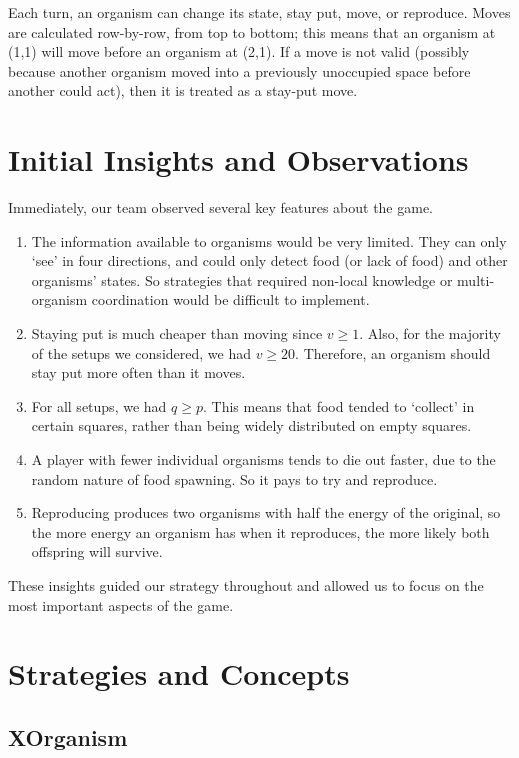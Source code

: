 \documentclass[
10pt, %
letterpaper, %
oneside, %
headinclude,footinclude, %
english
]{article}
\begin{document}
Each turn, an organism can change its state, stay put, move, or reproduce. Moves are calculated row-by-row, from top to bottom; this means that an organism at (1,1) will move before an organism at (2,1). If a move is not valid (possibly because another organism moved into a previously unoccupied space before another could act), then it is treated as a stay-put move.

\section{Initial Insights and Observations}

Immediately, our team observed several key features about the game.

\begin{enumerate}
  \item The information available to organisms would be very limited. They can only `see' in four directions, and could only detect food (or lack of food) and other organisms' states. So strategies that required non-local knowledge or multi-organism coordination would be difficult to implement.
  \item Staying put is much cheaper than moving since $v \geq 1$. Also, for the majority of the setups we considered, we had $v \geq 20$. Therefore, an organism should stay put more often than it moves.
  \item For all setups, we had $q \geq p$. This means that food tended to `collect' in certain squares, rather than being widely distributed on empty squares.
  \item A player with fewer individual organisms tends to die out faster, due to the random nature of food spawning. So it pays to try and reproduce.
  \item Reproducing produces two organisms with half the energy of the original, so the more energy an organism has when it reproduces, the more likely both offspring will survive.
\end{enumerate}

These insights guided our strategy throughout and allowed us to focus on the most important aspects of the game.

\section{Strategies and Concepts}

\subsection{XOrganism}
\end{document}
